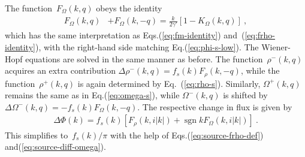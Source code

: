 \documentclass[preprint,aps,eqsecnum, prb]{revtex4-1}
\newcommand{\fplus}[1]{{#1}^{+}}
\newcommand{\fminus}[1]{{#1}^{-}}
\renewcommand{\Im}{\mathop{\mathrm{Im}}\nolimits}
\newcommand{\sgn}{\mathop{\mathrm{sgn}}\nolimits}
\begin{document}
The function~$F_\Omega(k, q)$ obeys the identity
\begin{align}
\label{eq:fomega-identity}
F_\Omega(k, q) & + F_\Omega(k, -q)
        = \frac{k}{2\gamma'} \left[1 - K_\Omega(k, q)\right]
\ ,
\end{align}
which has the same interpretation as Eqs.(\ref{eq:fm-identity})
and~(\ref{eq:frho-identity}), with the right-hand side
matching Eq.(\ref{eq:phi-s-low}).
The Wiener-Hopf equations are solved in the same manner as before.
The function~$\fminus{\rho}(k, q)$ acquires an extra contribution
$\Delta \fminus{\rho}(k, q) = f_s(k) F_\rho(k, -q)$, while
the function~$\fplus{\rho}(k, q)$ is again determined
by Eq.~(\ref{eq:rho-s}). Similarly, $\fplus{\Omega}(k, q)$
remains the same as in Eq.(\ref{eq:omega-s}),
while $\fminus{\Omega}(k, q)$
is shifted by~$\Delta\fminus{\Omega}(k, q) = - f_s(k) F_\Omega(k, -q)$.
The respective change in flux is given by
\begin{align}
\Delta \Phi(k)
= f_s(k) \left[F_\rho(k, i|k|) + \sgn k F_\Omega(k, i|k|)\right]
\ .
\end{align}
This simplifies to~$f_s(k) / \pi$ with the help of
Eqs.(\ref{eq:source-frho-def})  and(\ref{eq:source-diff-omega}).



\end{document}
